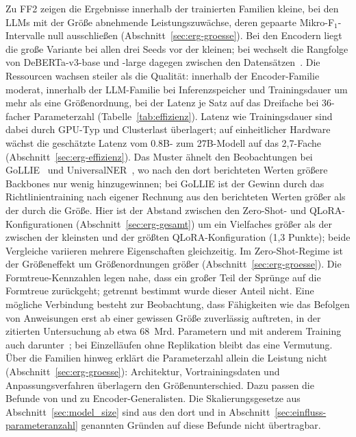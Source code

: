 Zu FF2 zeigen die Ergebnisse innerhalb der trainierten Familien kleine,
bei den LLMs mit der Größe abnehmende Leistungszuwächse, deren
gepaarte Mikro-F$_1$-Intervalle null ausschließen
(Abschnitt~\ref{sec:erg-groesse}).
Bei den Encodern liegt die große Variante bei allen drei Seeds vor der
kleinen; bei \textcite{keraghel2024recent} wechselt die Rangfolge von
DeBERTa-v3-base und -large dagegen zwischen den Datensätzen~\cite[Tab.~5]{keraghel2024recent}.
Die Ressourcen wachsen steiler als die Qualität: innerhalb der
Encoder-Familie moderat, innerhalb der LLM-Familie bei Inferenzspeicher
und Trainingsdauer um mehr als eine Größenordnung, bei der Latenz je
Satz auf das Dreifache bei 36-facher Parameterzahl
(Tabelle~\ref{tab:effizienz}). Latenz wie Trainingsdauer sind dabei
durch GPU-Typ und Clusterlast überlagert; auf einheitlicher Hardware wächst
die geschätzte Latenz vom 0.8B- zum 27B-Modell auf das 2,7-Fache
(Abschnitt~\ref{sec:erg-effizienz}).
Das Muster ähnelt den Beobachtungen bei GoLLIE~\cite[Abschn.~5.2]{sainz2024gollie} und UniversalNER~\cite[Abschn.~5.2]{zhou2024universalner}, wo nach den dort berichteten Werten größere Backbones nur wenig
hinzugewinnen; bei GoLLIE ist der Gewinn durch das Richtlinientraining
nach eigener Rechnung aus den berichteten Werten größer als der durch
die Größe. Hier ist der Abstand
zwischen den Zero-Shot- und QLoRA-Konfigurationen
(Abschnitt~\ref{sec:erg-gesamt}) um ein Vielfaches größer als der
zwischen der kleinsten und der größten QLoRA-Konfiguration (1,3 Punkte);
beide Vergleiche variieren mehrere Eigenschaften gleichzeitig.
Im Zero-Shot-Regime ist der Größeneffekt um Größenordnungen größer
(Abschnitt~\ref{sec:erg-groesse}).
Die Formtreue-Kennzahlen legen nahe, dass ein großer Teil der Sprünge
auf die Formtreue zurückgeht; getrennt bestimmt wurde dieser Anteil
nicht.
Eine mögliche Verbindung besteht zur Beobachtung, dass Fähigkeiten wie
das Befolgen von Anweisungen erst ab einer gewissen Größe
zuverlässig auftreten, in der zitierten Untersuchung ab etwa 68~Mrd.
Parametern und mit anderem
Training auch darunter~\cite{wei2022emergent}; bei Einzelläufen ohne
Replikation bleibt das eine Vermutung.
Über die Familien hinweg erklärt die Parameterzahl allein die Leistung
nicht (Abschnitt~\ref{sec:erg-groesse}):
Architektur, Vortrainingsdaten und Anpassungsverfahren überlagern den
Größenunterschied. Dazu passen die Befunde von
\textcite{zaratiana2024gliner} und \textcite{bogdanov2024nuner} zu
Encoder-Generalisten.
Die Skalierungsgesetze aus Abschnitt~\ref{sec:model_size} sind aus den
dort und in Abschnitt~\ref{sec:einfluss-parameteranzahl} genannten
Gründen auf diese Befunde nicht übertragbar.

